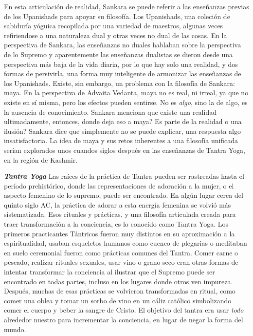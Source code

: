 En esta articulación de realidad, Sankara se puede referir a las enseñanzas previas de los Upanishads para apoyar su filosofía. Los Upanishads, una coleción de sabiduría yóguica recopilada por una variedad de maestros, algunas veces refiriendose a una naturaleza dual y otras veces no dual de las cosas. En la perspectiva de Sankara, las enseñanzas no duales hablaban sobre la perspectiva de lo Supremo y aparentemente las enseñanzas dualistas se dieron desde una perspectiva más baja de la vida diaria, por lo que hay solo una realidad, y dos formas de persivirla, una forma muy inteligente de armonizar las enseñanzas de los Upanishads. Existe, sin embargo, un problema con la filosofía de Sankara: maya. En la perspectiva de Advaita Vedanta, maya no es real, ni irreal, ya que no existe en sí misma, pero los efectos pueden sentirse. No es \textit{algo}, sino la  de algo, es la ausencia de conocimiento. Sankara menciona que existe una realidad ultimadamente, entonces, donde deja eso a maya? Es parte de la realidad o una ilusión? Sankara dice que simplemente no se puede explicar, una respuesta algo insatisfactoria. La idea de maya y sus retos inherentes a una filosofía unificada serían explorados unos cuandos siglos despu\'es en las enseñanzas de Tantra Yoga, en la región de Kashmir.

\textbf{\textit{Tantra Yoga}}
Las raíces de la práctica de Tantra pueden ser rastreadas hasta el período prehistórico, donde las representaciones de adoración a la mujer, o el aspecto femenino de lo supremo, puede ser encontrado. En algún lugar cerca del quinto siglo AC, la práctica de adorar a esta energía femenina se volvió más sistematizada. Esos rituales y prácticas, y una filosofía articulada creada para traer transformación a la conciencia, es lo conocido como Tantra Yoga. Los primeros practicantes Tántricos fueron muy distintos en su aproximación a la espiritualidad, usaban esqueletos humanos como cuenco de plegarias o meditaban en suelo ceremonial fueron como prácticas comunes del Tantra. Comer carne o pescado, realizar rituales sexuales, usar vino o grano seco eran otras formas de intentar transformar la conciencia al ilustrar que el Supremo puede ser encontrado en todas partes, incluso en los lugares donde otros ven impureza. Despu\'es, muchas de esas prácticas se volvieron transformadas en ritual, como comer una oblea y tomar un sorbo de vino en un cáliz católico simbolizando comer el cuerpo y beber la sangre de Cristo. El objetivo del tantra era usar \textit{todo} alrededor nuestro para incrementar la conciencia, en lugar de negar la forma del mundo.

